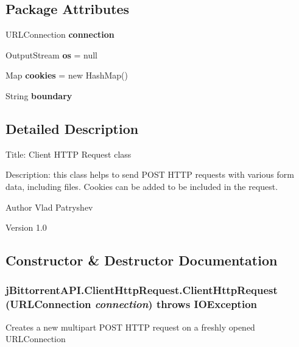 \subsection*{Package Attributes}
\begin{DoxyCompactItemize}
\item 
\hypertarget{classj_bittorrent_a_p_i_1_1_client_http_request_a026e95de6879f08cfe36038875a2f7e5}{
URLConnection {\bfseries connection}}
\label{classj_bittorrent_a_p_i_1_1_client_http_request_a026e95de6879f08cfe36038875a2f7e5}

\item 
\hypertarget{classj_bittorrent_a_p_i_1_1_client_http_request_ae63ff343e91b15770f5f587ce4a5fcfc}{
OutputStream {\bfseries os} = null}
\label{classj_bittorrent_a_p_i_1_1_client_http_request_ae63ff343e91b15770f5f587ce4a5fcfc}

\item 
\hypertarget{classj_bittorrent_a_p_i_1_1_client_http_request_a6fae0fe0119af61bde34712a5ae49961}{
Map {\bfseries cookies} = new HashMap()}
\label{classj_bittorrent_a_p_i_1_1_client_http_request_a6fae0fe0119af61bde34712a5ae49961}

\item 
String {\bfseries boundary}
\end{DoxyCompactItemize}


\subsection{Detailed Description}
Title: Client HTTP Request class 

Description: this class helps to send POST HTTP requests with various form data, including files. Cookies can be added to be included in the request.

\begin{DoxyAuthor}{Author}
Vlad Patryshev 
\end{DoxyAuthor}
\begin{DoxyVersion}{Version}
1.0 
\end{DoxyVersion}


\subsection{Constructor \& Destructor Documentation}
\hypertarget{classj_bittorrent_a_p_i_1_1_client_http_request_aa135f047107fd0feb72f5080913f50c3}{
\subsubsection[{ClientHttpRequest}]{\setlength{\rightskip}{0pt plus 5cm}jBittorrentAPI.ClientHttpRequest.ClientHttpRequest (URLConnection {\em connection})  throws IOException }}
\label{classj_bittorrent_a_p_i_1_1_client_http_request_aa135f047107fd0feb72f5080913f50c3}
Creates a new multipart POST HTTP request on a freshly opened URLConnection


